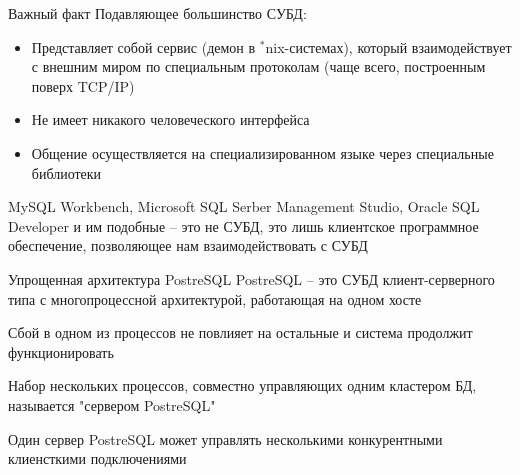 \documentclass[12pt]{article}
\begin{document}
\begin{Remark}{Важный факт}
    Подавляющее большинство СУБД:

    \begin{itemize}
        \item Представляет собой сервис (демон в $^*$nix-системах), который взаимодействует с внешним миром по специальным протоколам (чаще всего, построенным поверх TCP/IP)
        \item Не имеет никакого человеческого интерфейса
        \item Общение осуществляется на специализированном языке через специальные библиотеки
    \end{itemize}

    MySQL Workbench, Microsoft SQL Serber Management Studio, Oracle SQL Developer и им подобные -- это не СУБД, это лишь клиентское программное обеспечение, позволяющее нам взаимодействовать с СУБД
\end{Remark}

\begin{nota}{Упрощенная архитектура PostreSQL}
    PostreSQL -- это СУБД клиент-серверного типа с многопроцессной архитектурой, работающая на одном хосте 

    Сбой в одном из процессов не повлияет на остальные и система продолжит функционировать 

    Набор нескольких процессов, совместно управляющих одним кластером БД, называется "сервером PostreSQL"\

    Один сервер PostreSQL может управлять несколькими конкурентными клиенсткими подключениями 
\end{nota}
\end{document}
